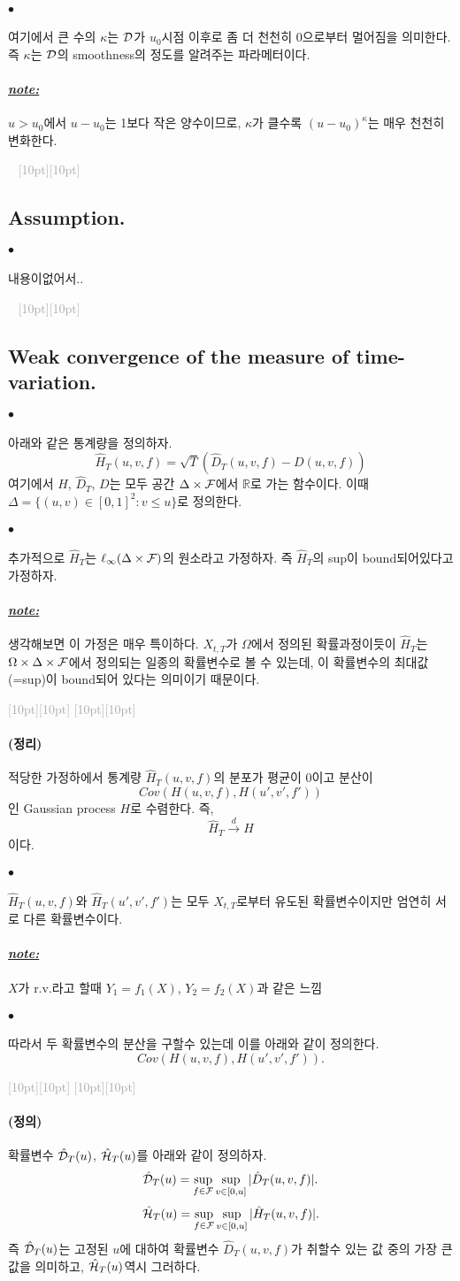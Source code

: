 \documentclass[12pt,oneside,english]{book}
\newcommand{\dash}{\vspace{2em}\noindent \textcolor{darkgray}{\hrulefill~ \raisebox{-2.5pt}[10pt][10pt]{\leafright \decofourleft \decothreeleft  \aldineright \decotwo \floweroneleft \decoone   \floweroneright \decotwo \aldineleft\decothreeright \decofourright \leafleft} ~  \hrulefill \\ \vspace{2em}}}
\newcommand{\rdash}{\noindent \textcolor{darkgray}{ \raisebox{-1.9pt}[10pt][10pt]{\leafright} \hrulefill \raisebox{-1.9pt}[10pt][10pt]{\leafright \decofourleft \decothreeleft  \aldineright \decotwo \floweroneleft \decoone}}}
\def\ck{\paragraph{\large$\bullet$}\large}
\def\dfn{\paragraph{\large(정의)}\large}
\def\thm{\paragraph{\large(정리)}\large}
\def\note{\paragraph{\large\textit{\underline{note:}}}\large}
\begin{document}
\ck 여기에서 큰 수의 $\kappa$는 $\cal D$가 $u_0$시점 이후로 좀 더 천천히 $0$으로부터 멀어짐을 의미한다. 즉 $\kappa$는 $\cal D$의 smoothness의 정도를 알려주는 파라메터이다. 

\note $u>u_0$에서 $u-u_0$는 1보다 작은 양수이므로, $\kappa$가 클수록 $(u-u_0)^{\kappa}$는 매우 천천히 변화한다.

\dash 

\subsection{Assumption.}

\ck 내용이없어서.. 

\dash 

\subsection{Weak convergence of the measure of time-variation.}

\ck 아래와 같은 통계량을 정의하자. 
$$\hat{H}_T(u,v,f)=\sqrt{T}\left(\hat{D}_T(u,v,f)-D(u,v,f)\right)$$ 
여기에서 $\hat{H}$, $\hat{D}_T$, $D$는 모두 공간 $\Delta \times {\cal F}$에서 $\mathbb{R}$로 가는 함수이다. 이때 $\Delta=\{(u,v)\in [0,1]^2:v\leq u\}$로 정의한다. 

\ck 추가적으로 $\hat{H}_T$는 $\ell_{\infty}(\Delta \times {\cal F})$의 원소라고 가정하자. 즉 $\hat{H}_T$의 sup이 bound되어있다고 가정하자.

\note 생각해보면 이 가정은 매우 특이하다. $X_{t,T}$가 $\Omega$에서 정의된 확률과정이듯이 $\hat{H}_T$는 $\Omega \times \Delta \times {\cal F}$에서 정의되는 일종의 확률변수로 볼 수 있는데, 이 확률변수의 최대값(=sup)이 bound되어 있다는 의미이기 때문이다.

\rdash 

\thm 적당한 가정하에서 통계량 $\hat{H}_T(u,v,f)$의 분포가 평균이 0이고 분산이 $$Cov(H(u,v,f),H(u',v',f'))$$인 Gaussian process $H$로 수렴한다. 즉, 
$$\hat{H}_T \overset{d}{\longrightarrow} H$$
이다. 

\ck $\hat{H}_T(u,v,f)$와 $\hat{H}_T(u',v',f')$는 모두 $X_{t,T}$로부터 유도된 확률변수이지만 엄연히 서로 다른 확률변수이다. 

\note $X$가 r.v.라고 할때 $Y_1=f_1(X)$, $Y_2=f_2(X)$과 같은 느낌

\ck 
따라서 두 확률변수의 분산을 구할수 있는데 이를 아래와 같이 정의한다. 
$$Cov(H(u,v,f),H(u',v',f')).$$

\rdash

\dfn 확률변수 $\hat{\cal D}_T(u)$, $\hat{\cal H}_T(u)$를 아래와 같이 정의하자. 
$$\hat{\cal D}_T(u)=\sup_{f\in {\cal F}}\sup_{v \in [0,u]} |\hat{D}_T(u,v,f)|.$$
$$\hat{\cal H}_T(u)=\sup_{f\in {\cal F}}\sup_{v \in [0,u]} |\hat{H}_T(u,v,f)|.$$
즉 $\hat{\cal D}_T(u)$는 고정된 $u$에 대하여 확률변수 $\hat{D}_T(u,v,f)$가 취할수 있는 값 중의 가장 큰 값을 의미하고, $\hat{\cal H}_T(u)$역시 그러하다. 
\end{document}
